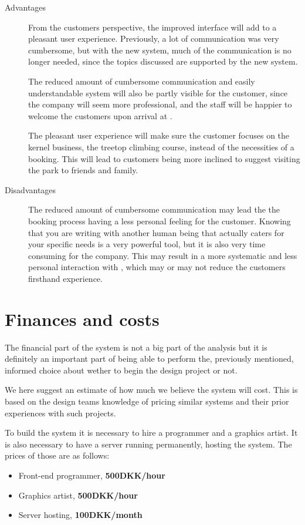\begin{description}
\item[Advantages]
From the customers perspective, the improved interface will add to a pleasant
user experience. Previously, a lot of communication was very cumbersome, but 
with the new system, much of the communication is no longer needed, since the
topics discussed are supported by the new system. 

The reduced amount of cumbersome communication and easily understandable system
will also be partly visible  for the customer, since the company will seem more
professional, and the staff will be happier to welcome the customers upon 
arrival at \gomonkey.

The pleasant user experience will make sure the customer focuses on the kernel
business, the treetop climbing course, instead of the necessities of a booking.
This will lead to customers being more inclined to suggest visiting the park
to friends and family. 

\item[Disadvantages]
The reduced amount of cumbersome communication may lead the the booking process having
a less personal feeling for the customer. Knowing that you are writing with
another human being that actually caters for your specific needs is a very 
powerful tool, but it is also very time consuming for the company. This may
result in a more systematic and less personal interaction with \gomonkey, which
may or may not reduce the customers firsthand experience.
\end{description}


\section{Finances and costs}
The financial part of the system is not a big part of the analysis but it is
definitely an important part of being able to perform the, previously mentioned,
informed choice about wether to begin the design project or not.

We here suggest an estimate of how much we believe the system will cost. This
is based on the design teams knowledge of pricing similar systems and their 
prior experiences with such projects. 

To build the system it is necessary to hire a programmer and a graphics artist.
It is also necessary to have a server running permanently, hosting the system. 
The prices of those are as follows:

\begin{itemize}
\item Front-end programmer, \textbf{500DKK/hour}
\item Graphics artist, \textbf{500DKK/hour}
\item Server hosting, \textbf{100DKK/month}
\end{itemize}

